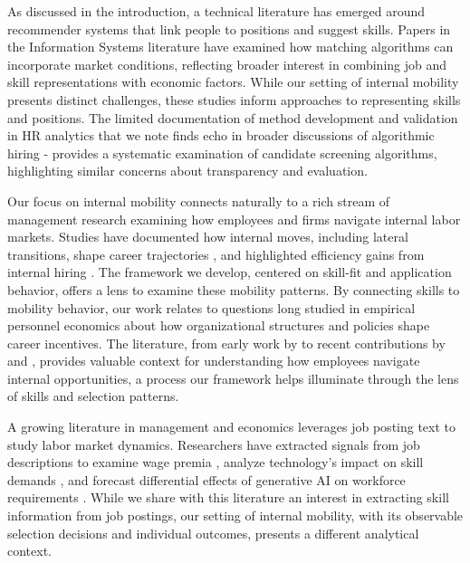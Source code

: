 \documentclass{article}
\begin{document}
As discussed in the introduction, a technical literature has emerged around recommender systems that link people to positions and suggest skills. Papers in the Information Systems literature \parencite{kokkodis2021demand, kokkodis2023good} have examined how matching algorithms can incorporate market conditions, reflecting broader interest in combining job and skill representations with economic factors. While our setting of internal mobility presents distinct challenges, these studies inform approaches to representing skills and positions. The limited documentation of method development and validation in HR analytics that we note finds echo in broader discussions of algorithmic hiring - \parencite{raghavan2020mitigating} provides a systematic examination of candidate screening algorithms, highlighting similar concerns about transparency and evaluation.



Our focus on internal mobility connects naturally to a rich stream of management research examining how employees and firms navigate internal labor markets. Studies have documented how internal moves, including lateral transitions, shape career trajectories \parencite{bidwell2024stepping}, and highlighted efficiency gains from internal hiring \parencite{bidwell2011paying}. The framework we develop, centered on skill-fit and application behavior, offers a lens to examine these mobility patterns. By connecting skills to mobility behavior, our work relates to questions long studied in empirical personnel economics about how organizational structures and policies shape career incentives. The literature, from early work by \textcite{baker1994internal, baker1994wage} to recent contributions by \textcite{tambe2020paying} and \textcite{huitfeldt2023internal}, provides valuable context for understanding how employees navigate internal opportunities, a process our framework helps illuminate through the lens of skills and selection patterns.


A growing literature in management and economics leverages job posting text to study labor market dynamics. Researchers have extracted signals from job descriptions to examine wage premia \parencite{Bana2021}, analyze technology's impact on skill demands \parencite{George2024}, and forecast differential effects of generative AI on workforce requirements \parencite{eloundou2024gpts, 2024_Acemoglu}. While we share with this literature an interest in extracting skill information from job postings, our setting of internal mobility, with its observable selection decisions and individual outcomes, presents a different analytical context.
\end{document}
